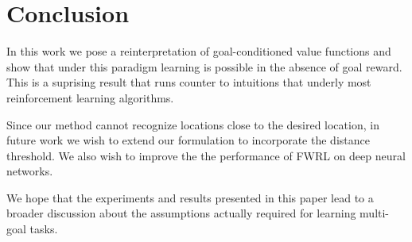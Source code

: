 \section{Conclusion}
In this work we pose a reinterpretation of goal-conditioned value
functions and show that under this paradigm learning is possible in the
absence of goal reward. This is a suprising result that runs counter
to intuitions that underly most reinforcement learning algorithms.  

Since our method cannot recognize locations close to the desired
location, in future work we wish to extend our formulation to
incorporate the distance threshold. We also wish to improve the
the performance of FWRL on deep neural networks. 

We hope that the experiments and results presented in this paper  lead
to a broader discussion about the assumptions actually required for
learning multi-goal tasks.
